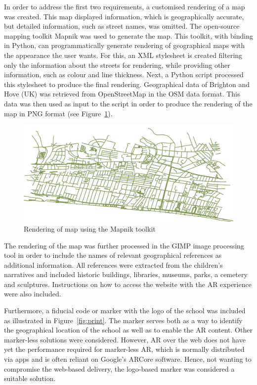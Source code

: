\documentclass[acmlarge,screen,dvipsnames]{acmart}
\begin{document}
In order to address the first two requirements, a customised rendering of a
map was created. This map displayed information, which is geographically
accurate, but detailed information, such as street names, was omitted. The
open-source mapping toolkit Mapnik \cite{mapnik} was used to generate the map.
This toolkit, with binding in Python, can programmatically generate rendering
of geographical maps with the appearance the user wants. For this, an XML
stylesheet is created filtering only the information about the streets for
rendering, while providing other information, such as colour and line thickness.
Next, a Python script processed this stylesheet to produce the final
rendering. Geographical data of Brighton and Hove (UK) was retrieved from OpenStreetMap
\cite{OpenStreetMap} in the OSM data format. This data was then used as input
to the script in order to produce the rendering of the map in PNG format (see
Figure~\ref{fig:map}).


\begin{figure}[b]
\includegraphics[width=\linewidth]{images/maprender.jpg}
\caption{Rendering of map using the Mapnik toolkit} \label{fig:map} 
\end{figure}
 
The rendering of the map was further processed in the GIMP image processing
tool \cite{gimp} in order to include the names of relevant
geographical references as additional information. All references were extracted from the children's
narratives and included historic buildings, libraries, museums, parks,
a cemetery and sculptures. Instructions on how to access the website with the AR
experience were also included.

Furthermore, a fiducial code or marker with the logo of the school was
included as illustrated in Figure~\ref{fig:print}. The marker serves both as a
way to identify the geographical location of the school as well as to enable
the AR content. Other marker-less solutions were considered. However, AR over
the web does not have yet the performance required for marker-less AR, which
is normally distributed via apps and is often reliant on Google's ARCore
software. Hence, not wanting to compromise the web-based delivery, the
logo-based marker was considered a suitable solution.
\end{document}
